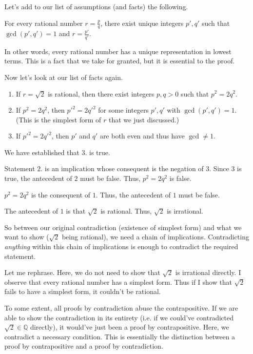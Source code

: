 Let's add to our list of assumptions (and facts) the following.
\begin{SNP}{\thm}For every rational number $r = \frac p q$, there exist unique integers $p', q'$ such that $\gcd (p', q') = 1$ and $r = \frac {p'}{q'}$.
\end{SNP}
In other words, every rational number has a unique representation in lowest terms. This is a fact that we take for granted, but it is essential to the proof.

Now let's look at our list of facts again.
\begin{enumerate}
    \item If $r = \sqrt 2$ is rational, then there exist integers $p, q > 0$ such that $p^2 = 2q^2$.
    \item If $p^2 = 2q^2$, then $p'^2 = 2q'^2$ for some integers $p', q'$ with $\gcd(p', q') = 1$. (This is the simplest form of $r$ that we just discussed.)
    \item If $p'^2 = 2q'^2$, then $p'$ and $q'$ are both even and thus have $\gcd \neq 1$.
\end{enumerate}
We have established that $3.$ is true.

Statement $2.$ is an implication whose consequent is the negation of $3$. Since $3$ is true, the antecedent of $2$ must be false. Thus, $p^2 = 2q^2$ is false.

$p^2 = 2q^2$ is the consequent of $1$. Thus, the antecedent of $1$ must be false.

The antecedent of $1$ is that $\sqrt 2$ is rational. Thus, $\sqrt 2$ is irrational.

So between our original contradiction (existence of simplest form) and what we want to show ($\sqrt 2$ being rational), we need a chain of implications. Contradicting \textit{anything} within this chain of implications is enough to contradict the required statement.

Let me rephrase. Here, we do not need to show that $\sqrt 2$ is irrational directly. I observe that every rational number has a simplest form. Thus if I show that $\sqrt 2$ fails to have a simplest form, it couldn't be rational.

To some extent, all proofs by contradiction abuse the contrapositive. If we are able to show the contradiction in its entirety (i.e. if we could've contradicted $\sqrt 2 \in \mathbb Q$ directly), it would've just been a proof by contrapositive. Here, we contradict a necessary condition. This is essentially the distinction between a proof by contrapositive and a proof by contradiction.

